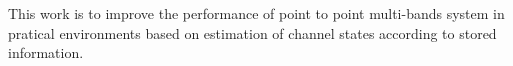 






This work is to improve the performance of point to point multi-bands system in pratical environments based on estimation of channel states according to stored information.

